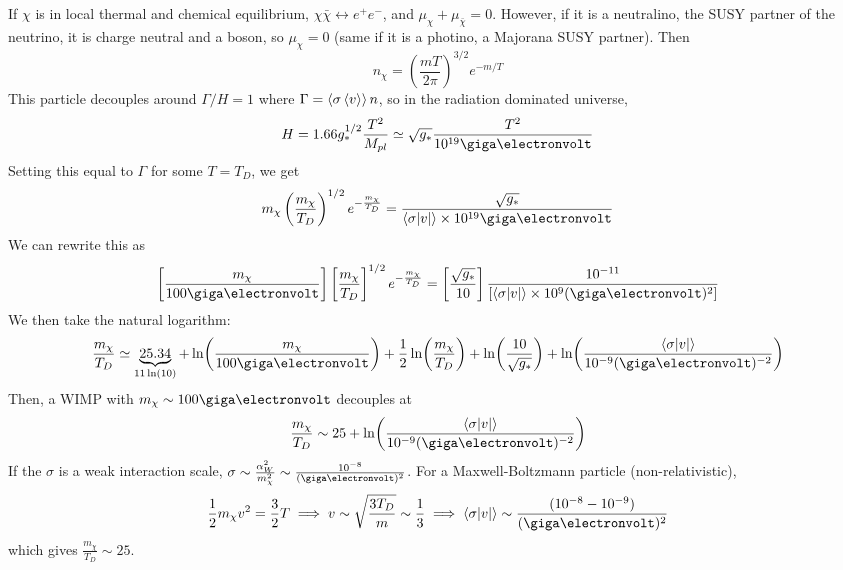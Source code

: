 \documentclass[a4paper,twoside,master.tex]{subfiles}
\begin{document}
If $ \chi $ is in local thermal and chemical equilibrium, $ \chi \bar{\chi} \leftrightarrow e^+ e^- $, and $ \mu_{\chi} + \mu_{\bar{\chi}} = 0  $. However, if it is a neutralino, the SUSY partner of the neutrino, it is charge neutral and a boson, so $ \mu_{\chi} = 0 $ (same if it is a photino, a Majorana SUSY partner). Then
\begin{equation}
    n_{\chi} = \left( \frac{m T}{2 \pi} \right)^{3/2} e^{-m/T}
\end{equation}
This particle decouples around $ \Gamma / H = 1 $ where $ \Gamma = \ev{\sigma \ev{v}} n $, so in the radiation dominated universe,
\begin{equation}
    H = 1.66 g_*^{1/2} \frac{T^2}{M_{pl}} \simeq \sqrt{g_*} \frac{T^2}{10^{19} \giga\electronvolt}
\end{equation}
Setting this equal to $ \Gamma $ for some $ T = T_D $, we get
\begin{equation}
    m_{\chi} \left( \frac{m_{\chi}}{T_D} \right)^{1/2} e^{- \frac{m_{\chi}}{T_D}} = \frac{\sqrt{g_*}}{\ev{\sigma \abs{v}} \times 10^{19} \giga\electronvolt}
\end{equation}
We can rewrite this as
\begin{equation}
    \left[ \frac{m_{\chi}}{100 \giga\electronvolt} \right] \left[ \frac{m_{\chi}}{T_D} \right]^{1/2} e^{- \frac{m_{\chi}}{T_D}} = \left[ \frac{\sqrt{g_*}}{10} \right] \frac{10^{-11}}{\left[ \ev{\sigma \abs{v}} \times 10^{9} (\giga\electronvolt)^2 \right]}
\end{equation}
We then take the natural logarithm:
\begin{equation}
    \frac{m_{\chi}}{T_D} \simeq \underbrace{25.34}_{11 \ln(10)} + \ln(\frac{m_{\chi}}{100 \giga\electronvolt}) + \frac{1}{2} \ln(\frac{m_{\chi}}{T_D}) + \ln(\frac{10}{\sqrt{g_*}}) + \ln(\frac{\ev{\sigma \abs{v}}}{10^{-9} (\giga\electronvolt)^{-2}})
\end{equation}
Then, a WIMP with $ m_{\chi} \sim 100 \giga\electronvolt $ decouples at
\begin{equation}
    \frac{m_{\chi}}{T_D} \sim 25 + \ln(\frac{\ev{\sigma \abs{v}}}{10^{-9} (\giga\electronvolt)^{-2}})
\end{equation}
If the $ \sigma $ is a weak interaction scale, $ \sigma \sim \frac{\alpha_W^2}{m_{\chi}^2} \sim \frac{10^{-8}}{(\giga\electronvolt)^2} $. For a Maxwell-Boltzmann particle (non-relativistic),
\begin{equation}
    \frac{1}{2} m_{\chi} v^2 = \frac{3}{2} T \implies v \sim \sqrt{\frac{3 T_D}{m}} \sim \frac{1}{3} \implies \ev{\sigma \abs{v}} \sim \frac{(10^{-8} - 10^{-9})}{(\giga\electronvolt)^2}
\end{equation}
which gives $ \frac{m_{\chi}}{T_D} \sim 25 $.
\end{document}
